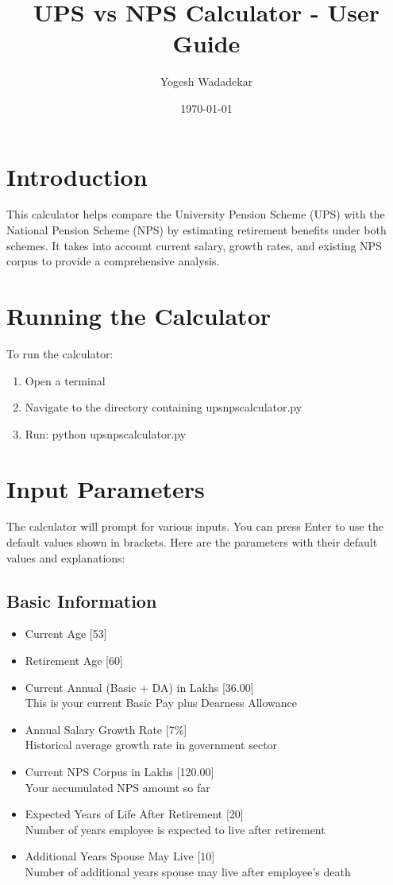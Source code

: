 \documentclass{article}
\title{UPS vs NPS Calculator - User Guide}
\author{Yogesh Wadadekar}
\date{\today}
\begin{document}
\maketitle

\section{Introduction}
This calculator helps compare the University Pension Scheme (UPS) with the National Pension Scheme (NPS) by estimating retirement benefits under both schemes. It takes into account current salary, growth rates, and existing NPS corpus to provide a comprehensive analysis.

\section{Running the Calculator}
To run the calculator:
\begin{enumerate}
    \item Open a terminal
    \item Navigate to the directory containing upsnpscalculator.py
    \item Run: python upsnpscalculator.py
\end{enumerate}

\section{Input Parameters}
The calculator will prompt for various inputs. You can press Enter to use the default values shown in brackets. Here are the parameters with their default values and explanations:

\subsection{Basic Information}
\begin{itemize}
    \item Current Age [53]
    \item Retirement Age [60]
    \item Current Annual (Basic + DA) in Lakhs [36.00] \\
          This is your current Basic Pay plus Dearness Allowance
    \item Annual Salary Growth Rate [7\%] \\
          Historical average growth rate in government sector
    \item Current NPS Corpus in Lakhs [120.00] \\
          Your accumulated NPS amount so far
    \item Expected Years of Life After Retirement [20] \\
          Number of years employee is expected to live after retirement
    \item Additional Years Spouse May Live [10] \\
          Number of additional years spouse may live after employee's death
\end{itemize}
\end{document}
